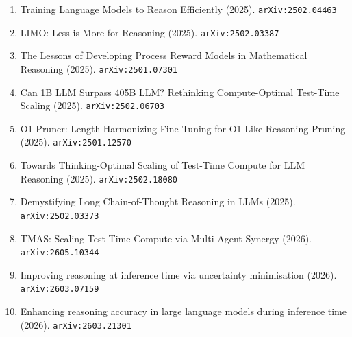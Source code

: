 \documentclass[11pt]{article}
\begin{document}
\begin{enumerate}
  \item Training Language Models to Reason Efficiently (2025). \texttt{arXiv:2502.04463}
  \item LIMO: Less is More for Reasoning (2025). \texttt{arXiv:2502.03387}
  \item The Lessons of Developing Process Reward Models in Mathematical Reasoning (2025). \texttt{arXiv:2501.07301}
  \item Can 1B LLM Surpass 405B LLM? Rethinking Compute-Optimal Test-Time
  Scaling (2025). \texttt{arXiv:2502.06703}
  \item O1-Pruner: Length-Harmonizing Fine-Tuning for O1-Like Reasoning Pruning (2025). \texttt{arXiv:2501.12570}
  \item Towards Thinking-Optimal Scaling of Test-Time Compute for LLM Reasoning (2025). \texttt{arXiv:2502.18080}
  \item Demystifying Long Chain-of-Thought Reasoning in LLMs (2025). \texttt{arXiv:2502.03373}
  \item TMAS: Scaling Test-Time Compute via Multi-Agent Synergy (2026). \texttt{arXiv:2605.10344}
  \item Improving reasoning at inference time via uncertainty minimisation (2026). \texttt{arXiv:2603.07159}
  \item Enhancing reasoning accuracy in large language models during inference time (2026). \texttt{arXiv:2603.21301}
\end{enumerate}
\end{document}
